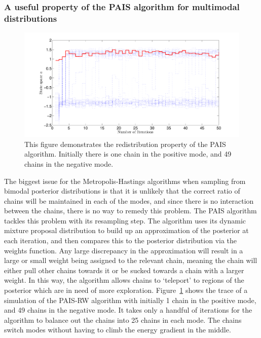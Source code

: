 \documentclass[final]{siamltex}
\begin{document}
\subsubsection{A useful property of the PAIS algorithm for multimodal distributions}

\begin{figure}[!ht]
\begin{center}
\includegraphics[width=\textwidth]{"figures/BM2_suction"}
\caption{This figure demonstrates the redistribution property of the
PAIS algorithm. Initially there is one chain in the positive mode, and
49 chains in the negative mode.}
\label{fig:BM2_suction}
\end{center}
\end{figure}

The biggest issue for the Metropolis-Hastings algorithms when sampling
from bimodal posterior distributions is that it is unlikely that the
correct ratio of chains will be maintained in each of the modes, and
since there is no interaction between the chains, there is no way to
remedy this problem. The PAIS algorithm tackles this problem with its
resampling step. The algorithm uses its dynamic mixture proposal distribution to build up an
approximation of the posterior at each iteration, and then compares
this to the posterior distribution via the weights function. Any large
discrepancy in the approximation will result in a large or small
weight being assigned to the relevant chain, meaning the chain will
either pull other chains towards it or be sucked towards a chain with
a larger weight. In this way, the algorithm allows chains to
`teleport' to regions of the posterior which are in need of more
exploration. Figure~\ref{fig:BM2_suction} shows the trace of a
simulation of the PAIS-RW algorithm with initially 1 chain in the
positive mode, and 49 chains in the negative mode. It takes only a
handful of iterations for the algorithm to balance out the chains into
25 chains in each mode. The chains switch modes without having to
climb the energy gradient in the middle.
\end{document}

